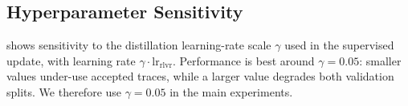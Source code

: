 \subsection{Hyperparameter Sensitivity}
\label{sec:ablations}



 shows sensitivity to the distillation learning-rate scale $\gamma$ used in the supervised update, with learning rate $\gamma\cdot \mathrm{lr}_{\mathrm{rlvr}}$. Performance is best around $\gamma=0.05$: smaller values under-use accepted traces, while a larger value degrades both validation splits. We therefore use $\gamma=0.05$ in the main experiments.

\begin{table}[t]
\centering
\scriptsize
\caption{Distillation scale $\gamma$ sensitivity.}
\label{tab:gamma-sensitivity}
\setlength{\tabcolsep}{2.5pt}
\renewcommand{\arraystretch}{0.9}
\end{table}

















